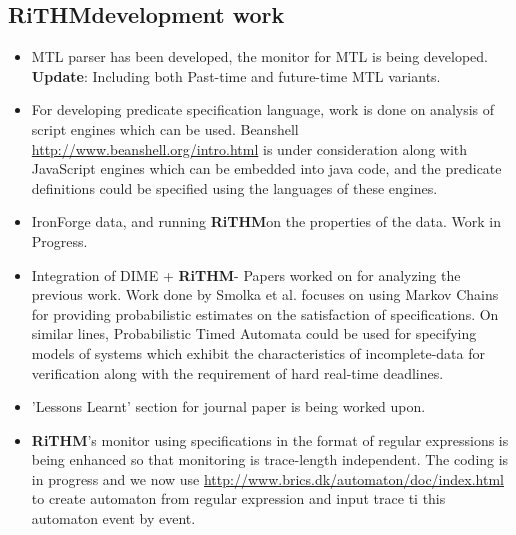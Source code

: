 \documentclass[]{article}
\newcommand{\rithm}{\textbf{RiTHM}\space}
\begin{document}
	\subsection{\rithm development work}
	\begin{itemize}
	\item MTL parser has been developed, the monitor for MTL is being developed. \textbf{Update}: Including both Past-time and future-time MTL variants. 
	\item For developing predicate specification language, work is done on analysis of script engines which can be used. Beanshell \url{http://www.beanshell.org/intro.html} is under consideration along with JavaScript engines which can be embedded into java code, and the predicate definitions could be specified using the languages of these engines.
	
	\item IronForge data, and running \rithm on the properties of the data. Work in Progress.
	
	\item Integration of DIME + \rithm - Papers worked on for analyzing the previous work. Work done by Smolka et al. focuses on using Markov Chains for providing probabilistic estimates on the satisfaction of specifications. On similar lines, Probabilistic Timed Automata could be used for specifying 
	models of systems which exhibit the characteristics of incomplete-data for verification along with the requirement of hard real-time deadlines.
	\item 'Lessons Learnt' section for journal paper is being worked upon.
	
	\item \rithm's monitor using specifications in the format of regular expressions is being enhanced so that monitoring is trace-length independent. The coding is in progress and we now use \url{http://www.brics.dk/automaton/doc/index.html} to create automaton from regular expression and input trace ti this automaton event by event. 
	

	

	\end{itemize}
	
\end{document}
